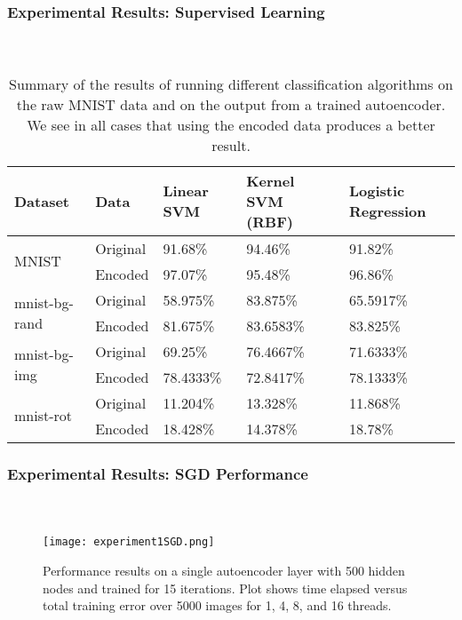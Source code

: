 \begin{frame}[t]
	\frametitle{Experimental Results: Supervised Learning}
	\framesubtitle{~~}  %


\begin{table}[h]
  \centering
\begin{tabular}{ll|lll}
    Dataset                        & Data               & Linear SVM & Kernel SVM (RBF) & Logistic Regression \\ \hline
    \multirow{2}{*}{MNIST}         & Original           & 91.68\%    & 94.46\%          & 91.82\%             \\
                                   & Encoded            & 97.07\%    & 95.48\%          & 96.86\%             \\ \hline
    \multirow{2}{*}{mnist-bg-rand} & Original           & 58.975\%   & 83.875\%         & 65.5917\%           \\
                                   & Encoded            & 81.675\%   & 83.6583\%        & 83.825\%            \\ \hline
    \multirow{2}{*}{mnist-bg-img}  & Original           & 69.25\%    & 76.4667\%        & 71.6333\%           \\
                                   & Encoded            & 78.4333\%  & 72.8417\%        & 78.1333\%           \\ \hline
    \multirow{2}{*}{mnist-rot}     & Original           & 11.204\%   & 13.328\%         & 11.868\%           \\
                                   & Encoded            & 18.428\%   & 14.378\%         & 18.78\%
\end{tabular}
  \caption{Summary of the results of running different classification algorithms on the raw MNIST data and on the output from a trained autoencoder. We
  see in all cases that using the encoded data produces a better result.}
  \label{tab:classvsenc}
\end{table}

\end{frame}

\begin{frame}[t]
	\frametitle{Experimental Results: SGD Performance}
	\framesubtitle{~~}  %
	\begin{figure}[h]
		\centering
		\texttt{[image: experiment1SGD.png]}
		\caption{Performance results on a single autoencoder layer with 500 hidden nodes and trained for 15 iterations. Plot shows time elapsed versus total training error over 5000 images for 1, 4, 8, and 16 threads.}
		\label{fig:experiment1}
	\end{figure}

\end{frame}


